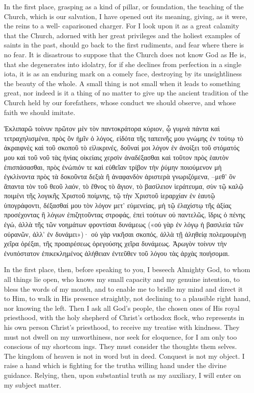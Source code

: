 \documentclass[10pt]{book}
\newcommand{\switchGreek}[1][]{\selectlanguage{polutonikogreek} \switchcolumn*[#1]}
\newcommand{\switchEnglish}{\selectlanguage{english} \switchcolumn}
\begin{document}
\begin{paracol}{2}
In the first place, grasping as a kind of
pillar, or foundation, the teaching of the Church,
which is our salvation, I have opened out its
meaning, giving, as it were, the reins to a well-
caparisoned charger. For I look upon it as a
great calamity that the Church, adorned with
her great privileges and the holiest examples of
saints in the past, should go back to the first
rudiments, and fear where there is no fear. It
is disastrous to suppose that the Church does
not know God as He is, that she degenerates
into idolatry, for if she declines from perfection
in a single iota, it is as an enduring mark on a
comely face, destroying by its unsightliness the
beauty of the whole. A small thing is not
small when it leads to something great, nor
indeed is it a thing of no matter to give up the
ancient tradition of the Church held by our
forefathers, whose conduct we should observe,
and whose faith we should imitate.

\switchGreek

Ἐκλιπαρῶ τοίνυν πρῶτον μὲν τὸν παντοκράτορα κύριον, ᾧ γυμνὰ πάντα καὶ τετραχηλισμένα, πρὸς ὃν ἡμῖν ὁ λόγος, εἰδότα τῆς ταπεινῆς μου γνώμης ἐν τούτῳ τὸ ἀκραιφνὲς καὶ τοῦ σκοποῦ τὸ εἰλικρινές, δοῦναί μοι λόγον ἐν ἀνοίξει τοῦ στόματός μου καὶ τοῦ νοῦ τὰς ἡνίας οἰκείαις χερσὶν ἀναδέξασθαι καὶ τοῦτον πρὸς ἑαυτὸν ἐπισπάσασθαι, πρὸς ἐνώπιόν τε καὶ εὐθεῖαν τρίβον τὴν ῥύμην ποιούμενον μὴ ἐγκλίνοντα πρὸς τὰ δοκοῦντα δεξιὰ ἢ ἀναφανδὸν ἀριστερὰ γνωριζόμενα, –μεθ’ ὃν ἅπαντα τὸν τοῦ θεοῦ λαόν, τὸ ἔθνος τὸ ἅγιον, τὸ βασίλειον ἱεράτευμα, σὺν τῷ καλῷ ποιμένι τῆς λογικῆς Χριστοῦ ποίμνης, τῷ τὴν Χριστοῦ ἱεραρχίαν ἐν ἑαυτῷ ὑπογράφοντι, δέξασθαί μου τὸν λόγον μετ’ εὐμενείας, μὴ τῷ ἐλαχίστῳ τῆς ἀξίας προσέχοντας ἢ λόγων ἐπιζητοῦντας στροφάς, ἐπεὶ τούτων οὐ παντελῶς, ἴδρις ὁ πένης ἐγώ, ἀλλὰ τῆς τῶν νοημάτων φροντίσαι δυνάμεως («οὐ γὰρ ἐν λόγῳ ἡ βασιλεία τῶν οὐρανῶν, ἀλλ’ ἐν δυνάμει»)· οὐ γὰρ νικῆσαι σκοπός, ἀλλὰ τῇ ἀληθείᾳ πολεμουμένῃ χεῖρα ὀρέξαι, τῆς προαιρέσεως ὀρεγούσης χεῖρα δυνάμεως.
Ἀρωγὸν τοίνυν τὴν ἐνυπόστατον ἐπικεκλημένος ἀλήθειαν ἐντεῦθεν τοῦ λόγου τὰς ἀρχὰς ποιήσομαι.

\switchEnglish

In the first place, then, before speaking to
you, I beseech Almighty God, to whom all
things lie open, who knows my small capacity
and my genuine intention, to bless the words
of my mouth, and to enable me to bridle my
mind and direct it to Him, to walk in His
presence straightly, not declining to a plausible
right hand, nor knowing the left. Then I ask
all God's people, the chosen ones of His royal
priesthood, with the holy shepherd of Christ's
orthodox flock, who represents in his own
person Christ's priesthood, to receive my
treatise with kindness. They must not dwell
on my unworthiness, nor seek for eloquence,
for I am only too conscious of my shortcom
ings. They must consider the thoughts them
selves. The kingdom of heaven is not in word
but in deed. Conquest is not my object. I
raise a hand which is fighting for the truth\textemdash a
willing hand under the divine guidance. Relying, then, upon substantial truth as my auxiliary,
I will enter on my subject matter.


\end{paracol}
\end{document}
